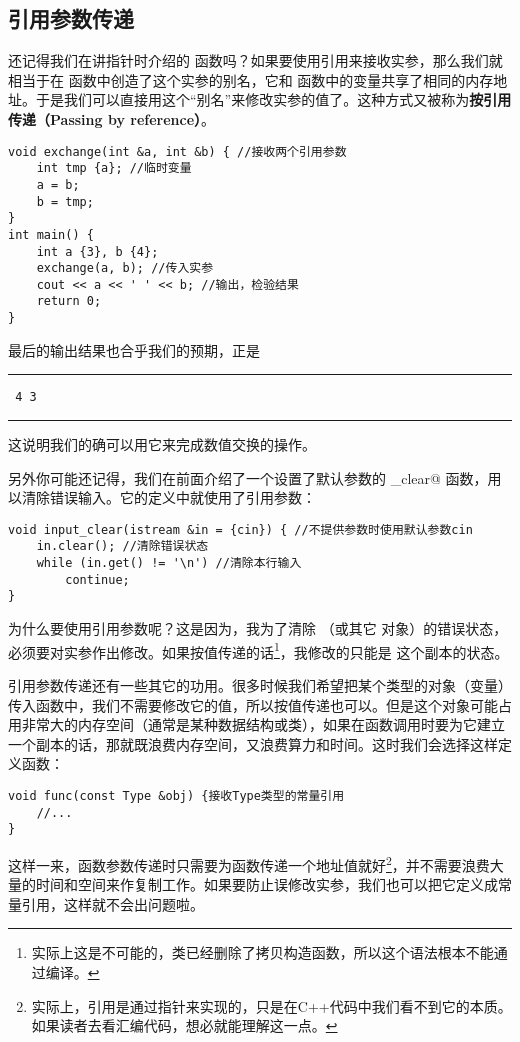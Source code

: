 \subsection*{引用参数传递}
还记得我们在讲指针时介绍的 \lstinline@exchange@ 函数吗？如果要使用引用来接收实参，那么我们就相当于在 \lstinline@exchange@ 函数中创造了这个实参的别名，它和 \lstinline@main@ 函数中的变量共享了相同的内存地址。于是我们可以直接用这个``别名''来修改实参的值了。这种方式又被称为\textbf{按引用传递（Passing by reference）}。
\begin{lstlisting}
void exchange(int &a, int &b) { //接收两个引用参数
    int tmp {a}; //临时变量
    a = b;
    b = tmp;
}
int main() {
    int a {3}, b {4};
    exchange(a, b); //传入实参
    cout << a << ' ' << b; //输出，检验结果
    return 0;
}
\end{lstlisting}
最后的输出结果也合乎我们的预期，正是\\\noindent\rule{\linewidth}{0.2pt}\texttt{
4 3
}\\\noindent\rule{\linewidth}{0.2pt}
这说明我们的确可以用它来完成数值交换的操作。\par
另外你可能还记得，我们在前面介绍了一个设置了默认参数的 \lstinline@input_clear@ 函数，用以清除错误输入。它的定义中就使用了引用参数：
\begin{lstlisting}
void input_clear(istream &in = {cin}) { //不提供参数时使用默认参数cin
    in.clear(); //清除错误状态
    while (in.get() != '\n') //清除本行输入
        continue;
}
\end{lstlisting}
为什么要使用引用参数呢？这是因为，我为了清除 \lstinline@cin@（或其它 \lstinline@istream@ 对象）的错误状态，必须要对实参作出修改。如果按值传递的话\footnote{实际上这是不可能的，\lstinline@istream@ 类已经删除了拷贝构造函数，所以这个语法根本不能通过编译。}，我修改的只能是 \lstinline@in@ 这个副本的状态。\par
引用参数传递还有一些其它的功用。很多时候我们希望把某个类型的对象（变量）传入函数中，我们不需要修改它的值，所以按值传递也可以。但是这个对象可能占用非常大的内存空间（通常是某种数据结构或类），如果在函数调用时要为它建立一个副本的话，那就既浪费内存空间，又浪费算力和时间。这时我们会选择这样定义函数：
\begin{lstlisting}
void func(const Type &obj) {接收Type类型的常量引用
    //...
}
\end{lstlisting}
这样一来，函数参数传递时只需要为函数传递一个地址值就好\footnote{实际上，引用是通过指针来实现的，只是在C++代码中我们看不到它的本质。如果读者去看汇编代码，想必就能理解这一点。}，并不需要浪费大量的时间和空间来作复制工作。如果要防止误修改实参，我们也可以把它定义成常量引用，这样就不会出问题啦。\par

